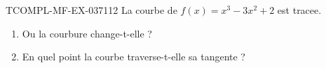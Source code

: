 \begin{exercice}{TCOMPL-MF-EX-037}{1}{12}
La courbe de $f(x) = x^3 - 3x^2 + 2$ est tracee.
\begin{enumerate}
  \item Ou la courbure change-t-elle ?
  \item En quel point la courbe traverse-t-elle sa tangente ?
\end{enumerate}

\end{exercice}
